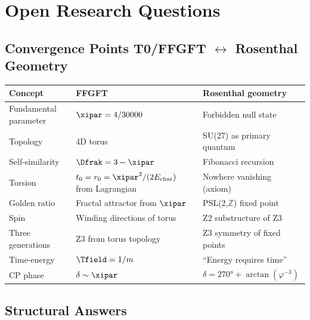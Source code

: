 \section{Open Research Questions}

\subsection{\texorpdfstring{Convergence Points T0/FFGFT $\leftrightarrow$ Rosenthal Geometry}{Convergence Points T0/FFGFT Rosenthal Geometry}}

\begin{center}
{\footnotesize\setlength{\tabcolsep}{3pt}
\begin{tabularx}{\textwidth}{lXX}
\toprule
Concept & FFGFT & Rosenthal geometry \\
\midrule
Fundamental parameter & $\xipar = 4/30000$ & Forbidden null state \\
Topology & 4D torus & SU(27) as primary quantum \\
Self-similarity & $\Dfrak = 3 - \xipar$ & Fibonacci recursion \\
Torsion & $t_0 = r_0 = \xipar^2/(2E_{\text{char}})$ from Lagrangian & Nowhere vanishing (axiom) \\
Golden ratio & Fractal attractor from $\xipar$ & PSL(2,$\mathbb{Z}$) fixed point \\
Spin & Winding directions of torus & Z2 substructure of Z3 \\
Three generations & Z3 from torus topology & Z3 symmetry of fixed points \\
Time-energy & $\Tfield = 1/m$ & ``Energy requires time'' \\
CP phase & $\delta \sim \xipar$ & $\delta = 270° + \arctan(\varphi^{-3})$ \\
\bottomrule
\end{tabularx}
} %
\end{center}

\subsection{Structural Answers}

